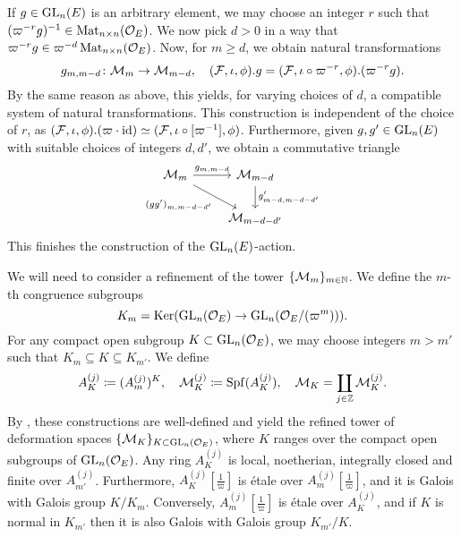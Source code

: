 \documentclass[../main.tex]{subfiles}
\begin{document}
If $g \in \operatorname{GL}_n(E)$ is an arbitrary element, we may choose an integer $r$ such
that $(\varpi^{-r} g)^{-1} \in \operatorname{Mat}_{n \times n}(\mathcal{O}_E)$. We now pick 
$d > 0$ in a way that $\varpi^{-r}g \in \varpi^{-d}\operatorname{Mat}_{n \times n}(\mathcal{O}_E)$. 
Now, for $m \geq d$, we obtain natural transformations
\begin{equation*}
  g_{m,m-d}\colon \mathcal{M}_{m} \to \mathcal{M}_{m-d}, \quad (\mathcal{F}, \iota, \phi).g = (\mathcal{F}, \iota \circ \varpi^{-r}, \phi).(\varpi^{-r}g).
\end{equation*}
By the same reason as above, this yields, for varying choices of $d$, a
compatible system of natural transformations.
This construction is independent of the choice of $r$, as $(\mathcal{F}, \iota,
\phi).(\varpi\cdot\operatorname{id}) \simeq (\mathcal{F}, \iota \circ [\varpi^{-1}], \phi)$.
Furthermore, given $g, g' \in \operatorname{GL}_n(E)$ with suitable choices of integers 
$d, d'$, we obtain a commutative triangle
\begin{equation*}
\begin{tikzcd}[ampersand replacement=\&]
	{\cM_{m}} \& {\cM_{m-d}} \\
	\& {\cM_{m-d-d'}}
	\arrow["{g_{m,m-d}}", from=1-1, to=1-2]
	\arrow["{(gg')_{m,m-d-d'}}"', from=1-1, to=2-2]
	\arrow["{g'_{m-d,m-d-d'}}", from=1-2, to=2-2]
\end{tikzcd}
\end{equation*}
This finishes the construction of the $\operatorname{GL}_n(E)$-action.


We will need to consider a refinement of the tower $\{\mathcal{M}_m\}_{m \in \mathbb{N}}$. We
define the 
$m$-th congruence subgroups
\begin{equation*}
  K_m = \operatorname{Ker}(\operatorname{GL}_n(\mathcal{O}_E) \to \operatorname{GL}_n(\mathcal{O}_E/(\varpi^m))).
\end{equation*}
For any compact open subgroup $K \subset \operatorname{GL}_n(\mathcal{O}_E)$, we may choose integers
$m > m'$ such that $K_m \subseteq K \subseteq K_{m'}$. We define 
\begin{equation*}
  A_K^{(j)} \coloneq (A^{(j)}_m)^K, \quad \mathcal{M}_K^{(j)} \coloneq \operatorname{Spf}(A_K^{(j)}), \quad
  \mathcal{M}_K = \coprod_{j \in \mathbb{Z}} \mathcal{M}_K^{(j)}.
\end{equation*}
By \cite[Proposition 2.2.5]{Strauch2008DefSp}, these constructions are well-defined
and yield the refined tower of deformation spaces 
$\{\mathcal{M}_K\}_{K \subset \operatorname{GL}_n(\mathcal{O}_E)}$, where $K$ ranges over 
the compact open subgroups of $\operatorname{GL}_n(\mathcal{O}_E)$. Any ring
$A_K^{(j)}$ is local, noetherian, integrally closed and finite over
$A_{m'}^{(j)}$.
Furthermore,
$A_{K}^{(j)}[\tfrac 1 \varpi]$ is \'etale over $A_{m}^{(j)}[\tfrac 1 \varpi]$, 
and it is Galois with Galois group $K/K_m$. Conversely, $A_{m}^{(j)}[\tfrac 1 \varpi]$
is \'etale over $A_K^{(j)}$, and if $K$ is normal in $K_{m'}$ then it is also
Galois with Galois group $K_{m'}/K$. 
\end{document}
